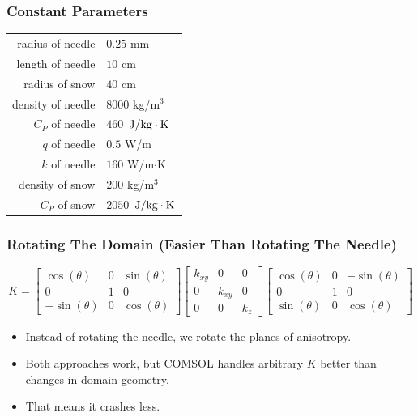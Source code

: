 \documentclass{beamer}
\begin{document}
\begin{frame}
\frametitle{Constant Parameters}
\begin{table}
\centering
\begin{tabular}{r | l}
radius of needle & \(0.25\) mm\\
length of needle & \(10\) cm\\
radius of snow & \(40\) cm\\
\hline
density of needle & \(8000\) kg/\(\textrm{m}^3\)\\
\(C_P\) of needle & \(460\) \(\left.{\textrm{J}}\middle/{\textrm{kg}\cdot\textrm{K}}\right.\) \\
\(q\) of needle & \(0.5\) W/m\\
\(k\) of needle & \(160\) W/m\(\cdot\)K\\
\hline
density of snow & \(200\) kg/\(\textrm{m}^3\)\\
\(C_P\) of snow & \(2050\)  \(\left.{\textrm{J}}\middle/{\textrm{kg}\cdot\textrm{K}}\right.\)
\end{tabular}
\end{table}
\end{frame}


\begin{frame}
\frametitle{Rotating The Domain (Easier Than Rotating The Needle)}
    \begin{equation*}
    K = \begin{bmatrix}
    \cos(\theta) & 0 & \sin(\theta)\\
    0 & 1 & 0\\
    -\sin(\theta) & 0 &\cos(\theta)
    \end{bmatrix}
    \begin{bmatrix}
    k_{xy} & 0 & 0\\
    0 & k_{xy} & 0\\
    0 & 0 & k_z
    \end{bmatrix}
    \begin{bmatrix}
    \cos(\theta) & 0 & -\sin(\theta)\\
    0 & 1 & 0\\
    \sin(\theta) & 0 &\cos(\theta)
    \end{bmatrix}
    \end{equation*}
    \begin{itemize}
    \item Instead of rotating the needle, we rotate the planes of anisotropy.
    \item Both approaches work, but COMSOL handles arbitrary \(K\) better than
          changes in domain geometry.
    \item That means it crashes less.
    \end{itemize}
\end{frame}
\end{document}
